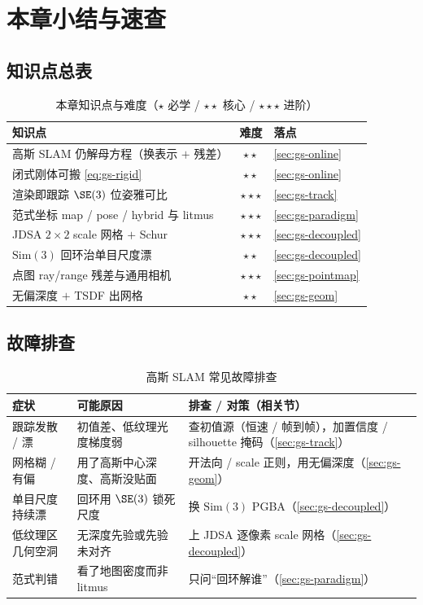 \section{本章小结与速查}
\label{sec:gs-summary}

\subsection{知识点总表}

\begin{table}[H]\centering
\caption{本章知识点与难度（$\star$ 必学 / $\star\star$ 核心 / $\star\star\star$ 进阶）}
\label{tab:gs-points}
\small
\begin{tabular}{@{}lcl@{}}
\toprule
知识点 & 难度 & 落点 \\
\midrule
高斯 SLAM 仍解母方程（换表示 $+$ 残差）& $\star\star$ & \cref{sec:gs-online} \\
闭式刚体可搬 \cref{eq:gs-rigid} & $\star\star$ & \cref{sec:gs-online} \\
渲染即跟踪 $\SE(3)$ 位姿雅可比 & $\star\star\star$ & \cref{sec:gs-track} \\
范式坐标 map / pose / hybrid 与 litmus & $\star\star\star$ & \cref{sec:gs-paradigm} \\
JDSA $2\times2$ scale 网格 $+$ Schur & $\star\star\star$ & \cref{sec:gs-decoupled} \\
$\mathrm{Sim}(3)$ 回环治单目尺度漂 & $\star\star$ & \cref{sec:gs-decoupled} \\
点图 ray/range 残差与通用相机 & $\star\star\star$ & \cref{sec:gs-pointmap} \\
无偏深度 $+$ TSDF 出网格 & $\star\star$ & \cref{sec:gs-geom} \\
\bottomrule
\end{tabular}
\end{table}

\subsection{故障排查}

\begin{table}[H]\centering
\caption{高斯 SLAM 常见故障排查}
\label{tab:gs-trouble}
\small
\begin{tabular}{@{}p{3.2cm}p{4.2cm}p{4.6cm}@{}}
\toprule
症状 & 可能原因 & 排查 / 对策（相关节）\\
\midrule
跟踪发散 / 漂 & 初值差、低纹理光度梯度弱 & 查初值源（恒速 / 帧到帧），加置信度 / silhouette 掩码（\cref{sec:gs-track}）\\
网格糊 / 有偏 & 用了高斯中心深度、高斯没贴面 & 开法向 / scale 正则，用无偏深度（\cref{sec:gs-geom}）\\
单目尺度持续漂 & 回环用 $\SE(3)$ 锁死尺度 & 换 $\mathrm{Sim}(3)$ PGBA（\cref{sec:gs-decoupled}）\\
低纹理区几何空洞 & 无深度先验或先验未对齐 & 上 JDSA 逐像素 scale 网格（\cref{sec:gs-decoupled}）\\
范式判错 & 看了地图密度而非 litmus & 只问“回环解谁”（\cref{sec:gs-paradigm}）\\
\bottomrule
\end{tabular}
\end{table}

